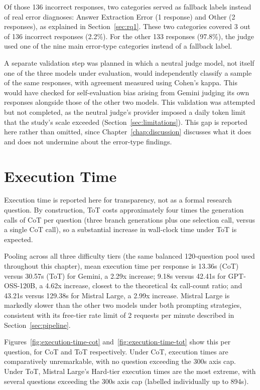 Of those 136 incorrect responses, two categories served as fallback
labels instead of real error diagnoses: Answer Extraction Error (1
response) and Other (2 responses), as explained in
Section~\ref{sec:rq1}. These two categories covered 3 out of 136
incorrect responses (2.2\%). For the other 133 responses (97.8\%), the
judge used one of the nine main error-type categories instead of a
fallback label.

A separate validation step was planned in which a neutral judge model,
not itself one of the three models under evaluation, would independently
classify a sample of the same responses, with agreement measured using
Cohen's kappa. This would have checked for self-evaluation bias arising
from Gemini judging its own responses alongside those of the other two
models. This validation was attempted but not completed, as the neutral
judge's provider imposed a daily token limit that the study's scale
exceeded (Section~\ref{sec:limitations}). This gap is reported here
rather than omitted, since Chapter~\ref{chap:discussion} discusses what
it does and does not undermine about the error-type findings.

\section{Execution Time}
\label{sec:execution-time}

Execution time is reported here for transparency, not as a formal
research question. By construction, ToT costs approximately four times
the generation calls of CoT per question (three branch generations plus
one selection call, versus a single CoT call), so a substantial increase
in wall-clock time under ToT is expected.

Pooling across all three difficulty tiers (the same balanced 120-question
pool used throughout this chapter), mean execution time per response is
13.36s (CoT) versus 30.57s (ToT) for Gemini, a 2.29x increase; 9.18s
versus 42.41s for GPT-OSS-120B, a 4.62x increase, closest to the
theoretical 4x call-count ratio; and 43.21s versus 129.38s for Mistral
Large, a 2.99x increase. Mistral Large is markedly slower than the other
two models under both prompting strategies, consistent with its
free-tier rate limit of 2 requests per minute described in
Section~\ref{sec:pipeline}.

Figures~\ref{fig:execution-time-cot} and~\ref{fig:execution-time-tot}
show this per question, for CoT and ToT respectively. Under CoT,
execution times are comparatively unremarkable, with no question
exceeding the 300s axis cap. Under ToT, Mistral Large's Hard-tier
execution times are the most extreme, with several questions exceeding
the 300s axis cap (labelled individually up to 894s).

